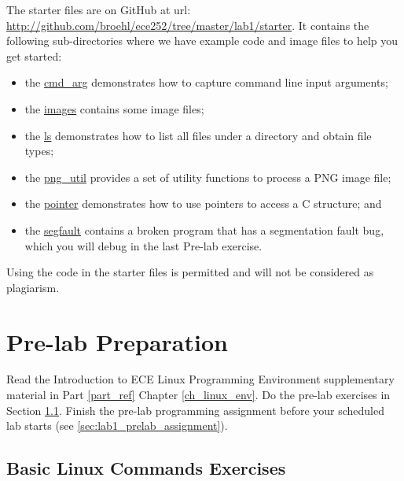 The starter files are on GitHub at url: \url{http://github.com/broehl/ece252/tree/master/lab1/starter}.
It contains the following sub-directories where we have example code and image files to help you get started:
\begin{itemize}
    \item the \href{http://github.com/yqh/ece252/tree/master/lab1/starter/cmd_arg}{cmd\_arg} demonstrates how to capture command line input arguments;
    \item the \href{http://github.com/yqh/ece252/tree/master/lab1/starter/images}{images} contains some image files;
    \item the \href{http://github.com/yqh/ece252/tree/master/lab1/starter/ls}{ls} demonstrates how to list all files under a directory and obtain file types;
    \item the \href{http://github.com/yqh/ece252/tree/master/lab1/starter/png_util}{png\_util} provides a set of utility functions to process a PNG image file;
    \item the \href{http://github.com/yqh/ece252/tree/master/lab1/starter/pointer}{pointer} demonstrates how to use pointers to access a C structure; and
    \item the \href{http://github.com/yqh/ece252/tree/master/lab1/starter/segfault}{segfault} contains a broken program that has a segmentation fault bug, which you will debug in the last Pre-lab exercise.
\end{itemize}
Using the code in the starter files is permitted and will not be considered as plagiarism.

\section{Pre-lab Preparation}

Read the Introduction to ECE Linux Programming Environment supplementary material in Part \ref{part_ref} Chapter \ref{ch_linux_env}. Do the pre-lab exercises in Section \ref{sec_ex1}. Finish the pre-lab programming assignment before your scheduled lab starts (see \ref{sec:lab1_prelab_assignment}).
\subsection{Basic Linux Commands Exercises}
\label{sec_ex1}

